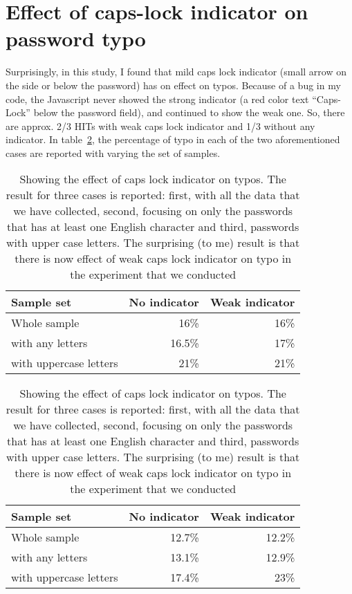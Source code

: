 \documentclass{article}
\begin{document}
\section{Effect of caps-lock indicator on password typo}
 Surprisingly, in this study, I found
that mild caps lock indicator (small arrow on the side or below the password)
has on effect on typos. Because of a bug in my code, the Javascript never showed
the strong indicator (a red color text ``Caps-Lock'' below the password field),
and continued to show the weak one. So, there are approx. 2/3 HITs with weak
caps lock indicator and 1/3 without any indicator.  In
table~\ref{tab-caps-lock}, the percentage of typo in each of the two
aforementioned cases are reported with varying the set of samples.

\begin{table}[h]
\centering
\small
\begin{tabular}{lrr}
  \hline
  Sample set & No indicator & Weak indicator\\\hline
  Whole sample &16\% &16\%\\
  with any letters &16.5\%&17\%\\
  with uppercase letters & 21\% & 21\%\\\hline
\end{tabular}\hspace{0.2in}
\begin{tabular}{lrr}
  \hline
  Sample set & No indicator & Weak indicator\\\hline
  Whole sample &12.7\% &12.2\%\\
  with any letters &13.1\%&12.9\%\\
  with uppercase letters & 17.4\% & 23\%\\\hline
\end{tabular}
\caption{Showing the effect of caps lock indicator on typos. The result
  for three cases is reported: first, with all the data that we have collected, second, focusing on
  only the passwords that has at least one English character and third,
  passwords with upper case letters. The surprising (to me)
  result is that there is now effect of weak caps lock indicator on typo in the
  experiment that we conducted}
\label{tab-caps-lock}
\end{table}
\end{document}
